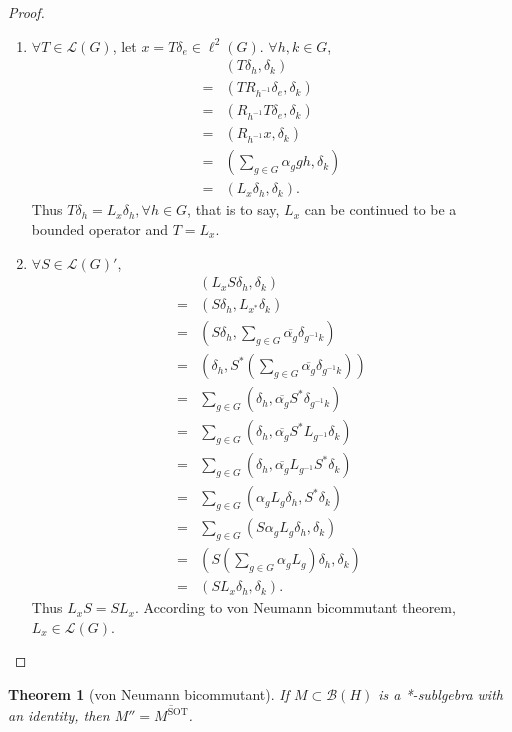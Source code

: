 \documentclass[12pt]{article}
\newtheorem{theorem}{Theorem}
\begin{document}
\begin{proof}
\begin{enumerate}
	\item
		$\forall T\in\mathcal L(G)$, let $x=T\delta_e\in\ell^2(G)$. $\forall h,k\in G$,
		\begin{align*}
		&(T\delta_h, \delta_k)\\
		=&(TR_{h^{-1}}\delta_e, \delta_k)\\
		=&(R_{h^{-1}}T\delta_e, \delta_k)\\
		=&(R_{h^{-1}}x,\delta_k)\\
		=&\left(\sum_{g\in G}\alpha_ggh,\delta_k \right)\\
		=&(L_x\delta_h,\delta_k).
		\end{align*}
		Thus $T\delta_h=L_x\delta_h,\forall h\in G$, that is to say, $L_x$ can be continued to be a bounded operator and $T=L_x$.
	\item
		$\forall S\in\mathcal L(G)'$, 
		\begin{align*}
		&(L_xS\delta_h, \delta_k)\\
		=&(S\delta_h,L_{x^*}\delta_k)\\
		=&\left(S\delta_h,\sum_{g\in G} \overline{\alpha_g}\delta_{g^{-1}k} \right)\\
		=&\left(\delta_h,S^*\left(\sum_{g\in G}\overline{\alpha_g}\delta_{g^{-1}k} \right) \right)\\
		=&\sum_{g\in G}(\delta_h,\overline{\alpha_g}S^*\delta_{g^{-1}k})\\
		=&\sum_{g\in G}(\delta_h,\overline{\alpha_g}S^*L_{g^{-1}}\delta_k)\\
		=&\sum_{g\in G}(\delta_h,\overline{\alpha_g}L_{g^{-1}}S^*\delta_k)\\
		=&\sum_{g\in G}(\alpha_gL_g\delta_h,S^*\delta_k)\\
		=&\sum_{g\in G}(S\alpha_gL_g\delta_h,\delta_k)\\
		=&\left(S\left(\sum_{g\in G}\alpha_gL_g \right)\delta_h,\delta_k \right)\\
		=&(SL_x\delta_h,\delta_k).
		\end{align*}
		Thus $L_xS=SL_x$. According to von Neumann bicommutant theorem, $L_x\in \mathcal L(G)$.
\end{enumerate}
\end{proof}

\begin{theorem}[von Neumann bicommutant]
If $M\subset\mathcal B(H)$ is a *-sublgebra with an identity, then $M''=\overline{M^{\mathrm{SOT}}}$.
\end{theorem}
\end{document}
